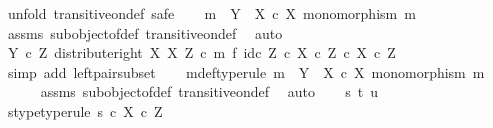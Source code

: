 \begin{isabellebody}
%
\isadelimproof
%
\endisadelimproof
%
\isatagproof
{}\isamarkupfalse%
\ {\isacharparenleft}{\kern0pt}unfold\ transitive{\isacharunderscore}{\kern0pt}on{\isacharunderscore}{\kern0pt}def{\isacharcomma}{\kern0pt}\ safe{\isacharparenright}{\kern0pt}\isanewline
\ \ \isamarkupfalse%
\ {\isachardoublequoteopen}m\ {\isacharcolon}{\kern0pt}\ Y\ {\isasymrightarrow}\ X\ {\isasymtimes}\isactrlsub c\ X{\isachardoublequoteclose}\ {\isachardoublequoteopen}monomorphism\ m{\isachardoublequoteclose}\isanewline
\ \ \ \ \isamarkupfalse%
\ assms\ subobject{\isacharunderscore}{\kern0pt}of{\isacharunderscore}{\kern0pt}def{}\ transitive{\isacharunderscore}{\kern0pt}on{\isacharunderscore}{\kern0pt}def\ \isamarkupfalse%
\ auto\isanewline
\ \ \isamarkupfalse%
\ \isamarkupfalse%
\ {\isachardoublequoteopen}{\isacharparenleft}{\kern0pt}Y\ {\isasymtimes}\isactrlsub c\ Z{\isacharcomma}{\kern0pt}\ distribute{\isacharunderscore}{\kern0pt}right\ X\ X\ Z\ {\isasymcirc}\isactrlsub c\ m\ {\isasymtimes}\isactrlsub f\ id\isactrlsub c\ Z{\isacharparenright}{\kern0pt}\ {\isasymsubseteq}\isactrlsub c\ {\isacharparenleft}{\kern0pt}X\ {\isasymtimes}\isactrlsub c\ Z{\isacharparenright}{\kern0pt}\ {\isasymtimes}\isactrlsub c\ X\ {\isasymtimes}\isactrlsub c\ Z{\isachardoublequoteclose}\isanewline
\ \ \ \ \isamarkupfalse%
\ {\isacharparenleft}{\kern0pt}simp\ add{\isacharcolon}{\kern0pt}\ left{\isacharunderscore}{\kern0pt}pair{\isacharunderscore}{\kern0pt}subset{\isacharparenright}{\kern0pt}\isanewline
{}\isamarkupfalse%
\isanewline
\ \ \isamarkupfalse%
\ m{\isacharunderscore}{\kern0pt}def{\isacharbrackleft}{\kern0pt}type{\isacharunderscore}{\kern0pt}rule{\isacharbrackright}{\kern0pt}{\isacharcolon}{\kern0pt}\ {\isachardoublequoteopen}m\ {\isacharcolon}{\kern0pt}\ Y\ {\isasymrightarrow}\ X\ {\isasymtimes}\isactrlsub c\ X{\isachardoublequoteclose}\ {\isachardoublequoteopen}monomorphism\ m{\isachardoublequoteclose}\isanewline
\ \ \ \ \isamarkupfalse%
\ assms\ subobject{\isacharunderscore}{\kern0pt}of{\isacharunderscore}{\kern0pt}def{}\ transitive{\isacharunderscore}{\kern0pt}on{\isacharunderscore}{\kern0pt}def\ \isamarkupfalse%
\ auto\isanewline
\isanewline
\ \ \isamarkupfalse%
\ s\ t\ u\isanewline
\ \ \isamarkupfalse%
\ s{\isacharunderscore}{\kern0pt}type{\isacharbrackleft}{\kern0pt}type{\isacharunderscore}{\kern0pt}rule{\isacharbrackright}{\kern0pt}{\isacharcolon}{\kern0pt}\ {\isachardoublequoteopen}s\ {\isasymin}\isactrlsub c\ X\ {\isasymtimes}\isactrlsub c\ Z{\isachardoublequoteclose}\isanewline

\end{isabellebody}
